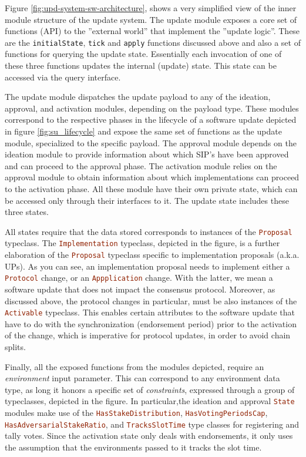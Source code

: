 Figure \ref{fig:upd-system-sw-architecture}, shows a very simplified view of
the
inner module structure of the update
system. The update module exposes a core set of functions (API) to the
''external world'' that implement the ''update logic''. These are the
\lstinline[language=Haskell]!initialState!,
\lstinline[language=Haskell]!tick! and \lstinline[language=Haskell]!apply!
functions discussed above and also a
set of functions for querying the update state. Essentially each invocation of
one of these three functions updates the internal (update) state. This state
can be accessed via the query interface.

The update module dispatches the update payload to any of the
ideation,
approval, and activation modules, depending on the payload type. These modules
correspond to the respective phases in the lifecycle of a software update
depicted in figure \ref{fig:su_lifecycle} and expose the same set of functions
as the update module, specialized to the specific payload.
The approval
module depends on the ideation module to provide information about which SIP's
have been approved and can proceed to the approval phase. The activation module
relies on the approval module to obtain information about which implementations
can proceed to the activation phase. All these module have their own private
state, which can be accessed only through their interfaces to it. The update
state includes these three states.

All states require that the data stored corresponds to instances of the
\lstinline[language=Haskell]!Proposal! typeclass. The
\lstinline[language=Haskell]!Implementation! typeclass, depicted in the figure,
is a further elaboration of the \lstinline[language=Haskell]!Proposal!
typeclass specific to implementation proposals (a.k.a. UPs). As you can see, an
implementation proposal needs to implement either a
\lstinline[language=Haskell]!Protocol! change, or an
\lstinline[language=Haskell]!Appplication! change. With the latter, we mean a
software update that does not impact the consensus protocol. Moreover, as
discussed above,
the protocol changes in particular, must be also instances of the
\lstinline[language=Haskell]!Activable! typeclass.
This enables certain attributes to the software update that have to do with the
synchronization (endorsement period) prior to the activation of the change,
which is imperative for protocol updates, in order to avoid chain splits.

Finally, all the exposed functions from the modules depicted, require an
\emph{environment} input parameter. This can correspond to any environment data
type, as long it honors a specific set of \emph{constraints}, expressed through
a group of typeclasses, depicted in the figure. In particular,the ideation and
approval
\lstinline[language=Haskell]!State! modules
make use of the \lstinline[language=Haskell]!HasStakeDistribution!,
\lstinline[language=Haskell]!HasVotingPeriodsCap!,
\lstinline[language=Haskell]!HasAdversarialStakeRatio!, and
\lstinline[language=Haskell]!TracksSlotTime! type classes for registering and
tally votes. Since
the activation state only deals with endorsements, it only uses the assumption
that the environments passed to it tracks the slot time.
